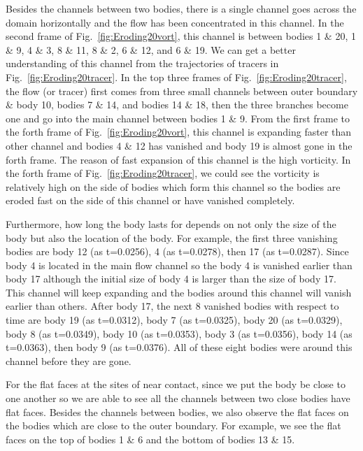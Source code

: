 \documentclass[preprint, 10pt]{elsarticle}
\begin{document}
{Besides the channels between two bodies, there is a single channel 
goes across the domain horizontally and
 the flow has been concentrated in this channel. 
In the second frame of Fig.~\ref{fig:Eroding20vort},
 this channel is between bodies 1 \& 20, 1 \& 9, 4 \& 3, 8 \& 11, 8 \& 2, 6 \& 12, and 6 \& 19. 
We can get a better understanding of this channel from 
the trajectories of tracers in Fig.~\ref{fig:Eroding20tracer}. 
In the top three frames of  Fig.~\ref{fig:Eroding20tracer},
the flow (or tracer) first comes from three small channels 
between outer boundary \& body 10, bodies 7 \& 14, and bodies 14 \& 18, 
then the three branches become one and go into the main channel between bodies 1 \& 9. 
From the first frame to the forth frame of Fig.~\ref{fig:Eroding20vort}, 
this channel is expanding faster than other channel 
and bodies 4 \& 12 has vanished and body 19 is almost gone in the forth frame. 
The reason of fast expansion of this channel is the high vorticity. 
In the forth frame of Fig.~\ref{fig:Eroding20tracer}, 
we could see the vorticity is relatively high on the side of bodies which form this channel
so the bodies are eroded fast on the side of this channel or have vanished completely.

Furthermore, how long the body lasts for depends on not only the size of the body 
but also the location of the body. 
For example, the first three vanishing bodies are 
body 12 (as t=0.0256), 4 (as t=0.0278), then 17 (as t=0.0287). 
Since body 4 is located in the main flow channel so 
the body 4 is vanished earlier than body 17 
although the initial size of body 4 is larger than the size of body 17.
This channel will keep expanding and the bodies around this channel will vanish earlier than others. 
After body 17, the next 8 vanished bodies with respect to time are body 19 (as t=0.0312),  
 body 7 (as t=0.0325), body 20 (as t=0.0329), body 8 (as t=0.0349), body 10 (as t=0.0353),
 body 3 (as t=0.0356), body 14 (as t=0.0363), then body 9 (as t=0.0376).  
All of these eight bodies were around this channel before they are gone.

For the flat faces at the sites of near contact, since we put the body be close to one another
so we are able to see all the channels between two close bodies have flat faces. 
Besides the channels between bodies, we also observe the flat faces on the bodies 
which are close to the outer boundary. For example, we see the flat faces 
on the top of bodies 1 \& 6 and the bottom of bodies 13 \& 15.  

}
\end{document}

